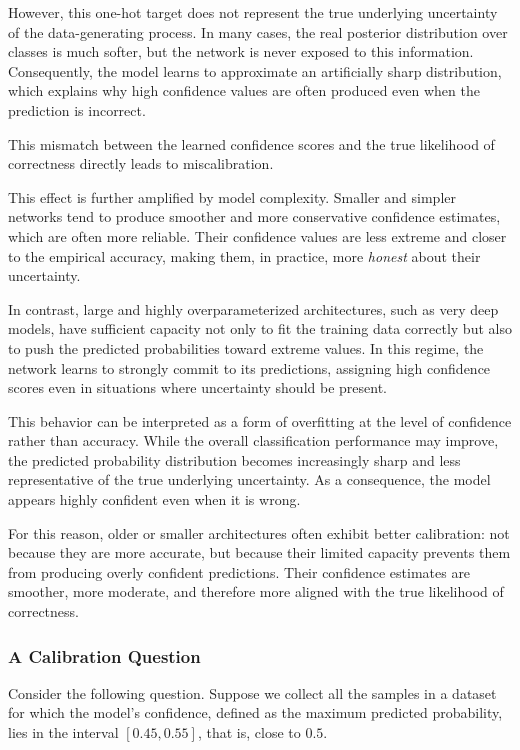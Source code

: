 However, this one-hot target does not represent the true underlying uncertainty of the data-generating process. In many cases, the real posterior distribution over classes is much softer, but the network is never exposed to this information. Consequently, the model learns to approximate an artificially sharp distribution, which explains why high confidence values are often produced even when the prediction is incorrect.

This mismatch between the learned confidence scores and the true likelihood of correctness directly leads to miscalibration.

This effect is further amplified by model complexity.
Smaller and simpler networks tend to produce smoother and more conservative confidence estimates, which are often more reliable. Their confidence values are less extreme and closer to the empirical accuracy, making them, in practice, more \emph{honest} about their uncertainty.

In contrast, large and highly overparameterized architectures, such as very deep models, have sufficient capacity not only to fit the training data correctly but also to push the predicted probabilities toward extreme values. In this regime, the network learns to strongly commit to its predictions, assigning high confidence scores even in situations where uncertainty should be present.

This behavior can be interpreted as a form of overfitting at the level of confidence rather than accuracy. While the overall classification performance may improve, the predicted probability distribution becomes increasingly sharp and less representative of the true underlying uncertainty. As a consequence, the model appears highly confident even when it is wrong.

For this reason, older or smaller architectures often exhibit better calibration: not because they are more accurate, but because their limited capacity prevents them from producing overly confident predictions. Their confidence estimates are smoother, more moderate, and therefore more aligned with the true likelihood of correctness.

\subsubsection{A Calibration Question}

Consider the following question. Suppose we collect all the samples in a dataset for which the model’s confidence, defined as the maximum predicted probability, lies in the interval $[0.45, 0.55]$, that is, close to $0.5$.

